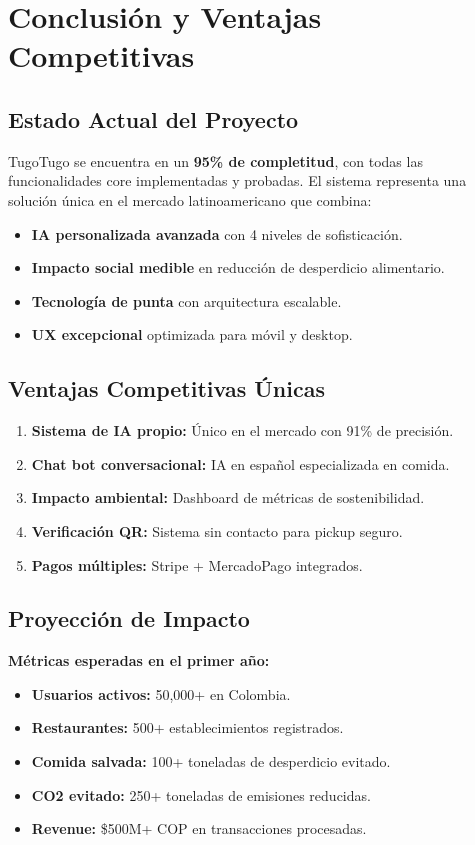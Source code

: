 \documentclass[a4paper,12pt]{article}
\begin{document}
\section{Conclusión y Ventajas Competitivas}

\subsection{Estado Actual del Proyecto}
TugoTugo se encuentra en un \textbf{95\% de completitud}, con todas las funcionalidades core implementadas y probadas. El sistema representa una solución única en el mercado latinoamericano que combina:

\begin{itemize}
  \item \textbf{IA personalizada avanzada} con 4 niveles de sofisticación.
  \item \textbf{Impacto social medible} en reducción de desperdicio alimentario.
  \item \textbf{Tecnología de punta} con arquitectura escalable.
  \item \textbf{UX excepcional} optimizada para móvil y desktop.
\end{itemize}

\subsection{Ventajas Competitivas Únicas}
\begin{enumerate}
  \item \textbf{Sistema de IA propio:} Único en el mercado con 91\% de precisión.
  \item \textbf{Chat bot conversacional:} IA en español especializada en comida.
  \item \textbf{Impacto ambiental:} Dashboard de métricas de sostenibilidad.
  \item \textbf{Verificación QR:} Sistema sin contacto para pickup seguro.
  \item \textbf{Pagos múltiples:} Stripe + MercadoPago integrados.
\end{enumerate}

\subsection{Proyección de Impacto}
\textbf{Métricas esperadas en el primer año:}
\begin{itemize}
  \item \textbf{Usuarios activos:} 50,000+ en Colombia.
  \item \textbf{Restaurantes:} 500+ establecimientos registrados.
  \item \textbf{Comida salvada:} 100+ toneladas de desperdicio evitado.
  \item \textbf{CO2 evitado:} 250+ toneladas de emisiones reducidas.
  \item \textbf{Revenue:} \$500M+ COP en transacciones procesadas.
\end{itemize}
\end{document}
